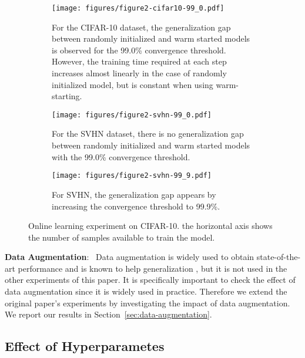 \begin{figure}
    \begin{subfigure}[t]{0.45\textwidth}
         \centering
         \texttt{[image: figures/figure2-cifar10-99\_0.pdf]}
         \caption{For the CIFAR-10 dataset, the generalization gap between randomly initialized and warm started models is observed for the 99.0\% convergence threshold. However, the training time required at each step increases almost linearly in the case of randomly initialized model, but is constant when using warm-starting.}
         \label{fig:fig2-cifar10}
     \end{subfigure}
     \hfill
     \begin{subfigure}[t]{0.225\textwidth}
         \centering
         \texttt{[image: figures/figure2-svhn-99\_0.pdf]}
         \caption{For the SVHN dataset, there is no generalization gap between randomly initialized and warm started models with the 99.0\% convergence threshold. }
         \label{fig:fig2-svhn}
     \end{subfigure}
     \hfill
     \begin{subfigure}[t]{0.225\textwidth}
         \centering
         \texttt{[image: figures/figure2-svhn-99\_9.pdf]}
         \caption{For SVHN, the generalization gap appears by increasing the convergence threshold to 99.9\%.}
         \label{fig:fig2-svhn-99.9}
     \end{subfigure}
%

    \caption{Online learning experiment on CIFAR-10. the horizontal axis shows the number of samples available to train the model.}
    \label{fig2-CIFAR-10-svhn-99}

\end{figure}

\textbf{Data Augmentation}:~ Data augmentation is widely used to obtain state-of-the-art performance and is known to help generalization \cite{shorten2019survey}, but it is not used in the other experiments of this paper. It is specifically important to check the effect of data augmentation since it is widely used in practice. Therefore we extend the original paper's experiments by investigating the impact of data augmentation. We report our results in Section~\ref{sec:data-augmentation}.

\subsection{Effect of Hyperparametes}

